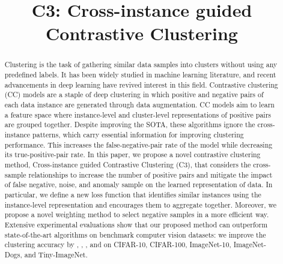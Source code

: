 \documentclass{bmvc2k}
\title{C3: Cross-instance guided Contrastive Clustering}
\begin{document}
\maketitle

\begin{abstract}
Clustering is the task of gathering similar data samples into clusters without using any predefined labels. It has been widely studied in machine learning literature, and recent advancements in deep learning have revived interest in this field. Contrastive clustering (CC) models are a staple of deep clustering in which positive and negative pairs of each data instance are generated through data augmentation. CC models aim to learn a feature space where instance-level and cluster-level representations of positive pairs are grouped together. Despite improving the SOTA, these algorithms ignore the cross-instance patterns, which carry essential information for improving clustering performance. This increases the false-negative-pair rate of the model while decreasing its true-positive-pair rate. In this paper, we propose a novel contrastive clustering method, Cross-instance guided Contrastive Clustering (C3), that considers the cross-sample relationships to increase the number of positive pairs and mitigate the impact of false negative, noise, and anomaly sample on the learned representation of data. In particular, we define a new loss function that identifies similar instances using the instance-level representation and encourages them to aggregate together. Moreover, we propose a novel weighting method to select negative samples in a more efficient way. Extensive experimental evaluations show that our proposed method can outperform state-of-the-art algorithms on benchmark computer vision datasets: we improve the clustering accuracy by , , ,  and   on CIFAR-10, CIFAR-100, ImageNet-10, ImageNet-Dogs, and Tiny-ImageNet.
\end{abstract}

\vspace{-4mm}
\end{document}
